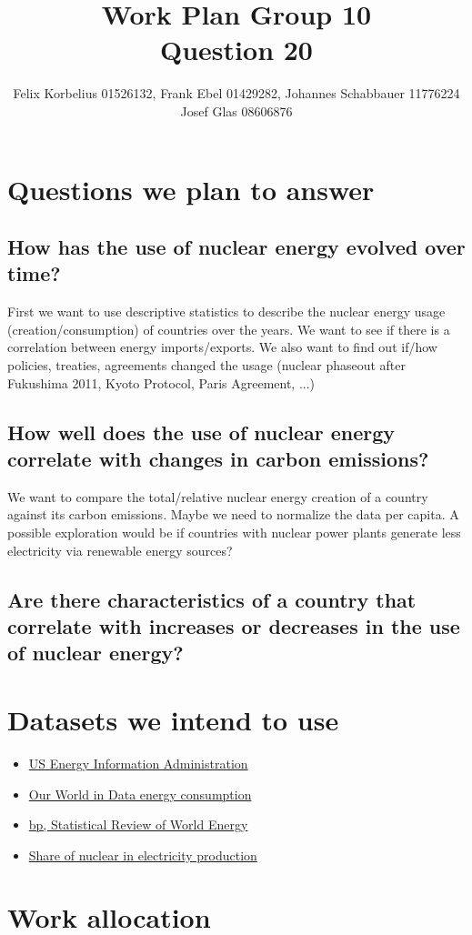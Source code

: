 \documentclass[a4paper,12pt]{article}
\author{Felix Korbelius 01526132, Frank Ebel 01429282,  Johannes Schabbauer 11776224\\Josef Glas 08606876}
\title{Work Plan Group 10\\Question 20}
\begin{document}
\maketitle


\section*{Questions we plan to answer}

	\subsection*{How has the use of nuclear energy evolved over time?}
	First we want to use descriptive statistics to describe the nuclear energy usage (creation/consumption) of countries over the years. We want to see if there is a correlation between energy imports/exports. We also want to find out if/how policies, treaties, agreements changed the usage (nuclear phaseout after Fukushima 2011, Kyoto Protocol, Paris Agreement, ...)
	
	\subsection*{How well does the use of nuclear energy correlate with changes in carbon emissions?}
	We want to compare the total/relative nuclear energy creation of a country against its carbon emissions. Maybe we need to normalize the data per capita.  A possible exploration would be if countries with nuclear power plants generate less electricity via renewable energy sources? 
	
	\subsection*{ Are there characteristics of a country that correlate with increases or decreases in the use of nuclear energy?}

	
\section*{Datasets we intend to use}
	\begin{itemize}
		\item
			\href{https://www.eia.gov/international/data/world}{US Energy Information Administration}
		
		\item
			\href{https://ourworldindata.org/grapher/energy-consumption-by-source-and-region?tab=table&time=earliest..latest}{Our World in Data energy consumption}
		
		\item
			\href{https://www.bp.com/en/global/corporate/energy-economics/statistical-review-of-world-energy.html}{bp, Statistical Review of World Energy}
		
		\item
			\href{https://ourworldindata.org/grapher/nuclear-renewables-electricity?time=1985..latest}{Share of nuclear in electricity production}
	\end{itemize}
	

\section*{Work allocation}
\end{document}
